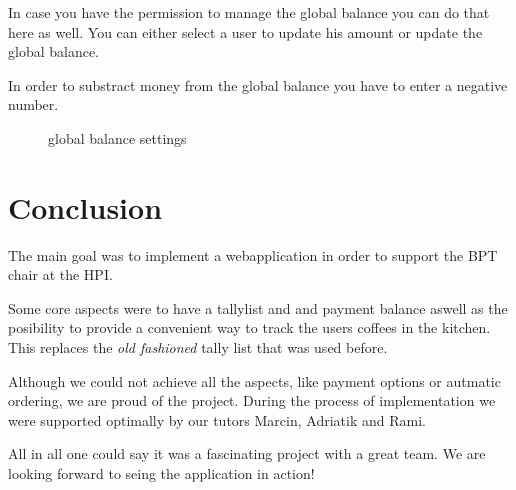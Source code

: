 In case you have the permission to manage the global balance you can do
that here as well. You can either select a user to update his amount or
update the global balance.

In order to substract money from the global balance you have to enter a
negative number.

\begin{figure}[htbp]
\centering
{}
\caption{global balance settings}
\end{figure}

\newpage
\newpage
\section{Conclusion}\label{conclusion}

The main goal was to implement a webapplication in order to support the
BPT chair at the HPI.

Some core aspects were to have a tallylist and and payment balance
aswell as the posibility to provide a convenient way to track the users
coffees in the kitchen. This replaces the \emph{old fashioned} tally
list that was used before.

Although we could not achieve all the aspects, like payment options or
autmatic ordering, we are proud of the project. During the process of
implementation we were supported optimally by our tutors Marcin,
Adriatik and Rami.

All in all one could say it was a fascinating project with a great team.
We are looking forward to seing the application in action!
